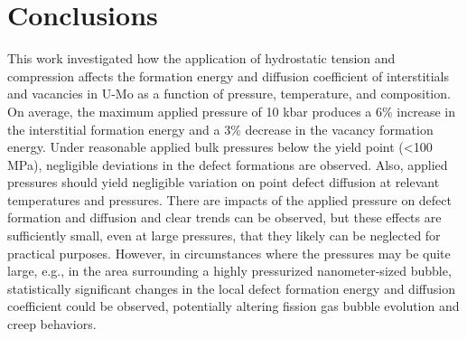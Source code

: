 \documentclass[11pt, oneside]{elsarticle}
\begin{document}
\section{Conclusions}
This work investigated how the application of hydrostatic tension and compression affects the formation energy and diffusion coefficient of interstitials and vacancies in U-Mo as a function of pressure, temperature, and composition. On average, the maximum applied pressure of 10 kbar produces a 6\% increase in the interstitial formation energy and a 3\% decrease in the vacancy formation energy. Under reasonable applied bulk pressures below the yield point (<100 MPa), negligible deviations in the defect formations are observed. Also, applied pressures should yield negligible variation on point defect diffusion at relevant temperatures and pressures. There are impacts of the applied pressure on defect formation and diffusion and clear trends can be observed, but these effects are sufficiently small, even at large pressures, that they likely can be neglected for practical purposes. However, in circumstances where the pressures may be quite large, e.g., in the area surrounding a highly pressurized nanometer-sized bubble, statistically significant changes in the local defect formation energy and diffusion coefficient could be observed, potentially altering fission gas bubble evolution and creep behaviors.



\end{document}
